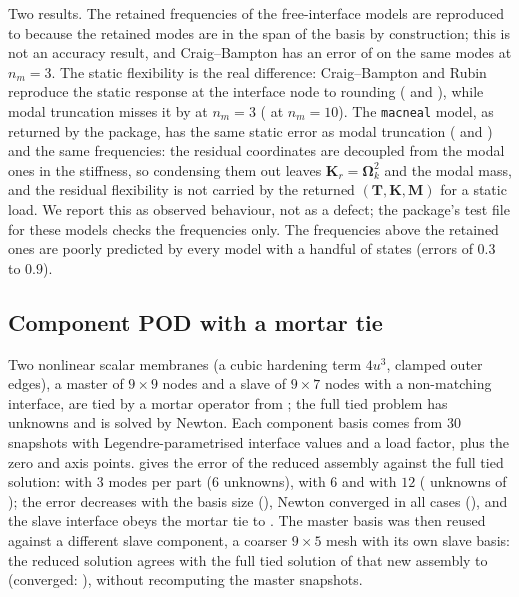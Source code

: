 \begin{table}[ht]
\centering\small

\caption{Free-interface and Craig--Bampton models of a chain of $40$ masses, interface at two nodes. ``lowest $n_m$ freq.'': largest relative error of the lowest $n_m$ frequencies; ``modes $n_m{+}1$ to size'': the frequencies above those, up to the model size; ``static tip error'': relative error of the displacement at the end node under a unit force at that node.}\label{tab:cm-free}
\end{table}

Two results. The retained frequencies of the free-interface models are reproduced to \ccmFreeRubinLow{} because the retained modes are in the span of the basis by construction; this is not an accuracy result, and Craig--Bampton has an error of \ccmFreeCbLowThree{} on the same modes at $n_m=3$. The static flexibility is the real difference: Craig--Bampton and Rubin reproduce the static response at the interface node to rounding (\ccmFreeCbStatic{} and \ccmFreeRubinStatic{}), while modal truncation misses it by \ccmFreeModalStatic{} at $n_m=3$ (\ccmFreeModalStaticTen{} at $n_m=10$). The \texttt{macneal} model, as returned by the package, has the same static error as modal truncation (\ccmFreeMacStatic{} and \ccmFreeMacStaticTen{}) and the same frequencies: the residual coordinates are decoupled from the modal ones in the stiffness, so condensing them out leaves $\bm K_r=\bm\Omega_k^2$ and the modal mass, and the residual flexibility is not carried by the returned $(\bm T,\bm K,\bm M)$ for a static load. We report this as observed behaviour, not as a defect; the package's test file for these models checks the frequencies only. The frequencies above the retained ones are poorly predicted by every model with a handful of states (errors of $0.3$ to $0.9$).

\subsection{Component POD with a mortar tie}

Two nonlinear scalar membranes (a cubic hardening term $4u^3$, clamped outer edges), a master of $9\times9$ nodes and a slave of $9\times7$ nodes with a non-matching interface, are tied by a mortar operator from ; the full tied problem has \ccmCompFull{} unknowns and is solved by Newton. Each component basis comes from $30$ snapshots with Legendre-parametrised interface values and a load factor, plus the zero and axis points.  gives the error of the reduced assembly against the full tied solution: \ccmCompErrThree{} with $3$ modes per part ($6$ unknowns), \ccmCompErrSix{} with $6$ and \ccmCompErrTwelve{} with $12$ (\ccmCompRedTwelve{} unknowns of \ccmCompFull{}); the error decreases with the basis size (\ccmCompMono), Newton converged in all cases (\ccmCompConv), and the slave interface obeys the mortar tie to \ccmCompTie. The master basis was then reused against a different slave component, a coarser $9\times5$ mesh with its own slave basis: the reduced solution agrees with the full tied solution of that new assembly to \ccmCompReuseErr{} (converged: \ccmCompReuseConv), without recomputing the master snapshots.

